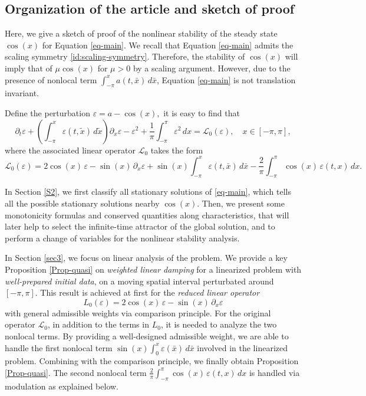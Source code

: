 \documentclass[12pt]{amsart}
\numberwithin{equation}{section}
\let\veps=\varepsilon
\numberwithin{equation}{section}
\begin{document}
\bigbreak

\subsection{Organization of the article and sketch of proof}
Here,  we give a sketch of proof of the nonlinear stability  of  the steady state $\cos( x)$ for Equation \eqref{eq-main}. We recall that Equation \eqref{eq-main} admits the scaling symmetry \eqref{id:scaling-symmetry}. Therefore, the stability of $\cos(x)$ will imply that of $\mu \cos(x)$ for $\mu>0$ by a scaling argument. However,  due to the presence of nonlocal term $\int_{-\pi}^x a(t,  \bar x)\,d\bar x$,  Equation \eqref{eq-main} is not translation invariant.

\medskip

 Define the perturbation $\varepsilon=a-\cos ( x),$ it is easy to find that
\begin{equation}\label{eq-vareps}
\partial_t \veps+  \left(\int_{-\pi}^x \veps(t, \tilde x) \,d\tilde x\right) \partial_x \veps  -\veps^2 +\frac{1}{\pi}  \int_{-\pi}^{\pi}\veps^2\,dx=\mathcal{L}_0(\veps),\quad x\in [-\pi,\pi],
\end{equation}
where the associated linear operator $\mathcal{L}_0$ takes the form
\begin{equation*} 
\mathcal{L}_0(\veps)= 2\cos( x) \,\veps -\sin ( x)\,\partial_x \veps +\sin( x) \int_{-\pi}^x \veps(t, \bar x) \,d\bar x - \frac{2}{\pi}  \int_{-\pi}^{\pi}\cos ( x)\, \veps(t,   x)\,dx.
\end{equation*}
 
 In Section \ref{S2},  we first classify all stationary solutions of \eqref{eq-main}, which tells all the possible stationary solutions nearby $\cos(x).$
 Then,  we  present some monotonicity formulas and conserved quantities along characteristics,  that will later help to select the infinite-time attractor of the global solution, and to perform a change of variables for the nonlinear stability analysis.
 
 \medskip
 
  In Section \ref{sec3},   we focus on linear analysis of the problem.   We provide a key Proposition \ref{Prop-quasi} on \emph{weighted linear  damping} for a linearized problem with {\em well-prepared initial data},  on a moving spatial interval perturbated around $[-\pi, \pi]$.     This result is achieved at first for the  {\em reduced linear operator} 
\begin{equation}\label{eq-linearL0}
 L_0 (\veps)= 2 \cos ( x) \,\veps-\sin ( x)\, \partial_x \veps
\end{equation}
with general admissible weights via comparison principle. For the original operator $\mathcal{L}_0$, in addition to the terms in $L_0$, it is needed to analyze the two nonlocal terms.    By providing a well-designed admissible weight,  we are able to handle the first nonlocal term  $\sin(x)\int_0^x \veps(\bar x)\,d\bar x$ involved in the  linearized problem. Combining with the comparison principle, we finally obtain Proposition \ref{Prop-quasi}. The second nonlocal term $\frac{2}{\pi}  \int_{-\pi}^{\pi}\cos ( x)\, \veps(t,   x)\,dx$ is handled via modulation as explained below.
 
\end{document}
